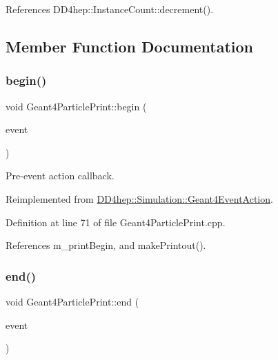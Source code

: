 References D\+D4hep\+::\+Instance\+Count\+::decrement().



\subsection{Member Function Documentation}
\hypertarget{class_d_d4hep_1_1_simulation_1_1_geant4_particle_print_ad1a3cbd1ef6837aa2bccb3b01c415d8f}{}\label{class_d_d4hep_1_1_simulation_1_1_geant4_particle_print_ad1a3cbd1ef6837aa2bccb3b01c415d8f} 
\subsubsection{\texorpdfstring{begin()}{begin()}}
{\footnotesize\ttfamily void Geant4\+Particle\+Print\+::begin (\begin{DoxyParamCaption}\item[{const G4\+Event $\ast$}]{event }\end{DoxyParamCaption})\hspace{0.3cm}{\ttfamily [virtual]}}



Pre-\/event action callback. 



Reimplemented from \hyperlink{class_d_d4hep_1_1_simulation_1_1_geant4_event_action_ad10785d157fa962f4ef2a5361bb0f5da}{D\+D4hep\+::\+Simulation\+::\+Geant4\+Event\+Action}.



Definition at line 71 of file Geant4\+Particle\+Print.\+cpp.



References m\+\_\+print\+Begin, and make\+Printout().

\hypertarget{class_d_d4hep_1_1_simulation_1_1_geant4_particle_print_ad2ba85711f58068667eb94d1f6b80012}{}\label{class_d_d4hep_1_1_simulation_1_1_geant4_particle_print_ad2ba85711f58068667eb94d1f6b80012} 
\subsubsection{\texorpdfstring{end()}{end()}}
{\footnotesize\ttfamily void Geant4\+Particle\+Print\+::end (\begin{DoxyParamCaption}\item[{const G4\+Event $\ast$}]{event }\end{DoxyParamCaption})\hspace{0.3cm}{\ttfamily [virtual]}}



